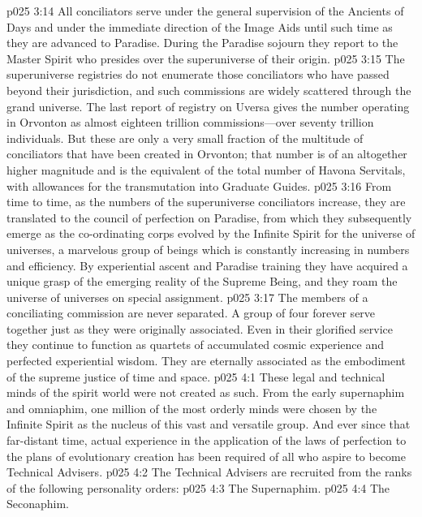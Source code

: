\pc \vs p025 3:14 All conciliators serve under the general supervision of the Ancients of Days and under the immediate direction of the Image Aids until such time as they are advanced to Paradise. During the Paradise sojourn they report to the Master Spirit who presides over the superuniverse of their origin.
\vs p025 3:15 The superuniverse registries do not enumerate those conciliators who have passed beyond their jurisdiction, and such commissions are widely scattered through the grand universe. The last report of registry on Uversa gives the number operating in Orvonton as almost eighteen trillion commissions---over seventy trillion individuals. But these are only a very small fraction of the multitude of conciliators that have been created in Orvonton; that number is of an altogether higher magnitude and is the equivalent of the total number of Havona Servitals, with allowances for the transmutation into Graduate Guides.
\vs p025 3:16 From time to time, as the numbers of the superuniverse conciliators increase, they are translated to the council of perfection on Paradise, from which they subsequently emerge as the co\hyp{}ordinating corps evolved by the Infinite Spirit for the universe of universes, a marvelous group of beings which is constantly increasing in numbers and efficiency. By experiential ascent and Paradise training they have acquired a unique grasp of the emerging reality of the Supreme Being, and they roam the universe of universes on special assignment.
\vs p025 3:17 The members of a conciliating commission are never separated. A group of four forever serve together just as they were originally associated. Even in their glorified service they continue to function as quartets of accumulated cosmic experience and perfected experiential wisdom. They are eternally associated as the embodiment of the supreme justice of time and space.
\vs p025 4:1 These legal and technical minds of the spirit world were not created as such. From the early supernaphim and omniaphim, one million of the most orderly minds were chosen by the Infinite Spirit as the nucleus of this vast and versatile group. And ever since that far\hyp{}distant time, actual experience in the application of the laws of perfection to the plans of evolutionary creation has been required of all who aspire to become Technical Advisers.\plusone
\pc \vs p025 4:2 The Technical Advisers are recruited from the ranks of the following personality orders:
\pc \vs p025 4:3 \bibnobreakspace The Supernaphim.
\vs p025 4:4 \bibnobreakspace The Seconaphim.

